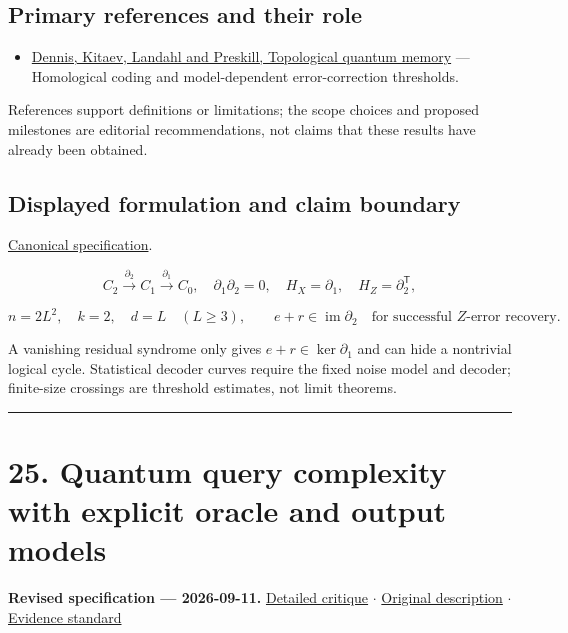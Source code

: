 \documentclass[
  11pt,
]{article}
\providecommand{\tightlist}{%
  \setlength{\itemsep}{0pt}\setlength{\parskip}{0pt}}
\begin{document}
\subsection{Primary references and their role}

\begin{itemize}
\tightlist
\item
  \href{https://arxiv.org/abs/quant-ph/0110143}{Dennis, Kitaev, Landahl
  and Preskill, Topological quantum memory} --- Homological coding and
  model-dependent error-correction thresholds.
\end{itemize}

References support definitions or limitations; the scope choices and
proposed milestones are editorial recommendations, not claims that these
results have already been obtained.

\subsection{Displayed formulation and claim boundary}

\href{https://github.com/rick-stevens-ai/Pure-Thought/blob/main/PRDs/24-Topological-Quantum-Error-Correction.md}{Canonical
specification}.

\[C_2\xrightarrow{\partial_2}C_1\xrightarrow{\partial_1}C_0,
\quad\partial_1\partial_2=0,\quad H_X=\partial_1,\quad H_Z=\partial_2^{\mathsf T},\]

\[n=2L^2,\quad k=2,\quad d=L\quad(L\ge3),\qquad
e+r\in\operatorname{im}\partial_2\quad\text{for successful }Z\text{-error recovery}.\]

A vanishing residual syndrome only gives \(e+r\in\ker\partial_1\) and
can hide a nontrivial logical cycle. Statistical decoder curves require
the fixed noise model and decoder; finite-size crossings are threshold
estimates, not limit theorems.

\begin{center}\rule{0.5\linewidth}{0.5pt}\end{center}

\section{25. Quantum query complexity with explicit oracle and output
models}

\textbf{Revised specification --- 2026-09-11.}
\href{https://github.com/rick-stevens-ai/Pure-Thought/blob/main/reviews/25-Quantum-Algorithms-Complexity.md}{Detailed
critique} \ensuremath{\cdot}
\href{https://github.com/rick-stevens-ai/Pure-Thought/blob/main/archive/original-PRDs/25-Quantum-Algorithms-Complexity.md}{Original
description} \ensuremath{\cdot}
\href{https://github.com/rick-stevens-ai/Pure-Thought/blob/main/reviews/EVIDENCE-STANDARD.md}{Evidence
standard}
\end{document}
